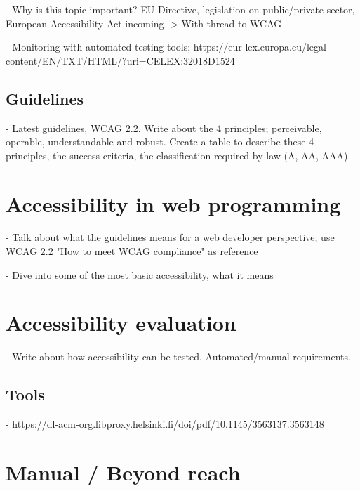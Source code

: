 - Why is this topic important? EU Directive, legislation on public/private sector, European Accessibility Act incoming -> With thread to WCAG

- Monitoring with automated testing tools; https://eur-lex.europa.eu/legal-content/EN/TXT/HTML/?uri=CELEX:32018D1524

\subsection{Guidelines}

- Latest guidelines, WCAG 2.2. Write about the 4 principles; perceivable, operable, understandable and robust. Create a table to describe these 4 principles, the success criteria, the classification required by law (A, AA, AAA).

\section{Accessibility in web programming}

- Talk about what the guidelines means for a web developer perspective; use WCAG 2.2 "How to meet WCAG compliance" as reference

- Dive into some of the most basic accessibility, what it means
\section{Accessibility evaluation}

- Write about how accessibility can be tested. Automated/manual requirements.

\subsection{Tools}

- https://dl-acm-org.libproxy.helsinki.fi/doi/pdf/10.1145/3563137.3563148

\section{Manual / Beyond reach}